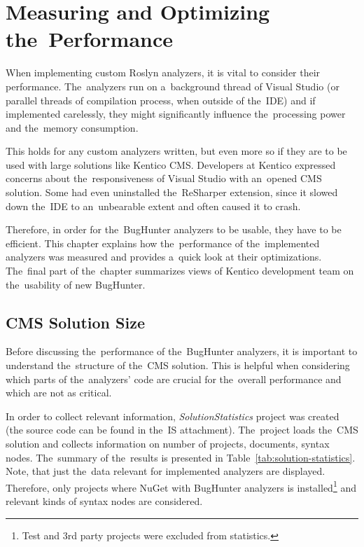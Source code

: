 \documentclass[
  digital, %
  table,   %
  lof,     %
  lot,     %
  oneside,
]{fithesis3}
\begin{document}
\chapter{Measuring and Optimizing the~Performance}
\label{chap:performance}
When implementing custom Roslyn analyzers, it is vital to consider their performance. The~analyzers run on a~background thread of Visual Studio (or parallel threads of compilation process, when outside of the~IDE) and if implemented carelessly, they might significantly influence the~processing power and the~memory consumption.

This holds for any custom analyzers written, but even more so if they are to be used with large solutions like Kentico CMS. Developers at Kentico expressed concerns about the~responsiveness of Visual Studio with an~opened CMS solution. Some had even uninstalled the~ReSharper extension, since it slowed down the~IDE to an~unbearable extent and often caused it to crash. 

Therefore, in order for the~BugHunter analyzers to be usable, they have to be efficient. This chapter explains how the~performance of the~implemented analyzers was measured and provides a~quick look at their optimizations. The~final part of the~chapter summarizes views of Kentico development team on the~usability of new BugHunter.

\section{CMS Solution Size}
\label{sec:cms-solution-size}
Before discussing the~performance of the~BugHunter analyzers, it is important to understand the~structure of the~CMS solution. This is helpful when considering which parts of the~analyzers' code are crucial for the~overall performance and which are not as critical.

In order to collect relevant information, \textit{SolutionStatistics} project was created (the source code can be found in the~IS attachment). The~project loads the~CMS solution and collects information on number of projects, documents, syntax nodes. The~summary of the~results is presented in Table~\ref{tab:solution-statistics}. Note, that just the~data relevant for implemented analyzers are displayed. Therefore, only projects where NuGet with BugHunter analyzers is installed\footnote{Test and 3rd party projects were excluded from statistics.} and relevant kinds of syntax nodes are considered.
\end{document}
